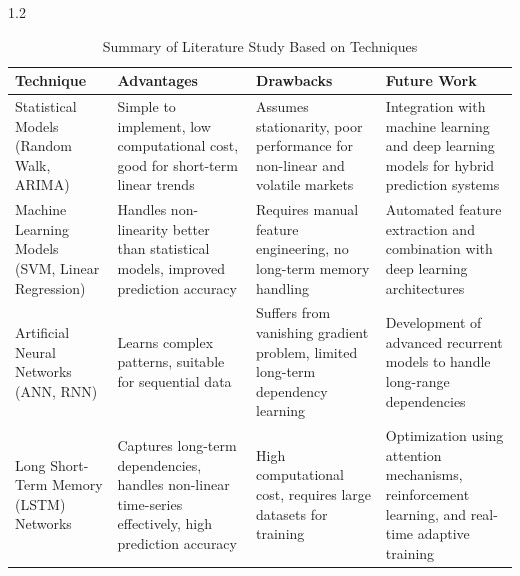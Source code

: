 \documentclass[12pt, a4paper]{report}
\begin{document}
\begin{spacing}{1.2}
\begin{table}[H]
    \centering
    \caption{Summary of Literature Study Based on Techniques}
    \begin{tabular}{|p{3.5cm}|p{4cm}|p{4cm}|p{4cm}|}
        \hline
        \textbf{Technique} & \textbf{Advantages} & \textbf{Drawbacks} & \textbf{Future Work} \\
        \hline
        Statistical Models (Random Walk, ARIMA) 
        & Simple to implement, low computational cost, good for short-term linear trends 
        & Assumes stationarity, poor performance for non-linear and volatile markets 
        & Integration with machine learning and deep learning models for hybrid prediction systems \\
        \hline
        Machine Learning Models (SVM, Linear Regression) 
        & Handles non-linearity better than statistical models, improved prediction accuracy 
        & Requires manual feature engineering, no long-term memory handling 
        & Automated feature extraction and combination with deep learning architectures \\
        \hline
        Artificial Neural Networks (ANN, RNN) 
        & Learns complex patterns, suitable for sequential data 
        & Suffers from vanishing gradient problem, limited long-term dependency learning 
        & Development of advanced recurrent models to handle long-range dependencies \\
        \hline
        Long Short-Term Memory (LSTM) Networks 
        & Captures long-term dependencies, handles non-linear time-series effectively, high prediction accuracy 
        & High computational cost, requires large datasets for training 
        & Optimization using attention mechanisms, reinforcement learning, and real-time adaptive training \\
        \hline
    \end{tabular}
\end{table}





\end{spacing}
\end{document}
